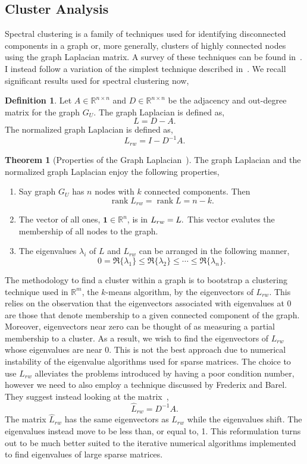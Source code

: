 \documentclass[letterpaper, 10 pt, conference]{ieeeconf}
\theoremstyle{definition}
\newtheorem{definition}{Definition}[section]
\newtheorem{theorem}{Theorem}[section]
\let\ker\relax
\DeclareMathOperator{\rank}{rank}
\DeclareMathOperator{\ker}{ker}
\newcommand{\R}{\mathbb{R}}
\begin{document}
\subsection{Cluster Analysis}\label{sec:implement:cluster}
Spectral clustering is a family of techniques used for identifying disconnected components in a graph or, more generally, clusters of highly connected nodes using the graph Laplacian matrix. A survey of these techniques can be found in~\cite{Article:Survey}. I instead follow a variation of the simplest technique described in~\cite{Notes:Laplacian, Article:LaplacianTutorial}. We recall significant results used for spectral clustering now,
\begin{definition}
  Let \(A\in\R^{n \times n}\) and \(D\in\R^{n\times n}\) be the adjacency and out-degree matrix for the graph \(G_U.\) The graph Laplacian is defined as,
  \[
    L = D - A.
  \]
  The normalized graph Laplacian is defined as,
  \[
    L_{rw} = I - D^{-1}A.
  \]
\end{definition}
\begin{theorem}[Properties of the Graph Laplacian~\cite{Notes:Network}]
  The graph Laplacian and the normalized graph Laplacian enjoy the following properties,
  \begin{enumerate}[label=(\alph*)]
    \item{
      Say graph \(G_U\) has \(n\) nodes with \(k\) connected components. Then \[\rank L_{rw} = \rank L = n - k.\]
    }
    \item{
      The vector of all ones, \(\mathbf{1} \in \R^n\), is in \(\ker L_{rw} = \ker L.\) This vector evalutes the membership of all nodes to the graph.
    }
    \item{
      The eigenvalues \(\lambda_i\) of \(L\) and \(L_{rw}\) can be arranged in the following manner,
      \[
        0 = \Re\{\lambda_1\} \leq \Re\{\lambda_2\} \leq \cdots \leq \Re\{\lambda_n\}.
      \]
    }
  \end{enumerate}
\end{theorem}
The methodology to find a cluster within a graph is to bootstrap a clustering technique used in \(\R^m\), the \(k\)-means algorithm, by the eigenvectors of \(L_{rw}.\) This relies on the observation that the eigenvectors associated with eigenvalues at 0 are those that denote membership to a given connected component of the graph. Moreover, eigenvectors near zero can be thought of as measuring a partial membership to a cluster. As a result, we wish to find the eigenvectors of \(L_{rw}\) whose eigenvalues are near 0. This is not the best approach due to numerical instability of the eigenvalue algorithms used for sparse matrices. The choice to use \(L_{rw}\) alleviates the problems introduced by having a poor condition number, however we need to also employ a technique discussed by Frederix and Barel. They suggest instead looking at the matrix~\cite{Article:CholeskyLaplacian},
\[
  \hat{L}_{rw} = D^{-1}A.
\]
The matrix \(\hat{L}_{rw}\) has the same eigenvectors as \(L_{rw}\) while the eigenvalues shift. The eigenvalues instead move to be less than, or equal to, 1. This reformulation turns out to be much better suited to the iterative numerical algorithms implemented to find eigenvalues of large sparse matrices.
\end{document}
